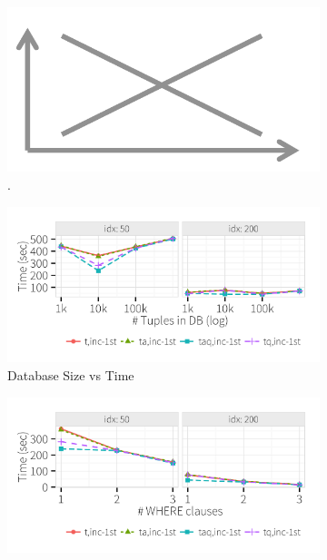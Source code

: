   \begin{figure}[h]
    \centering
    \begin{subfigure}[t]{.3\textwidth}
      \includegraphics[width = \columnwidth]{figures/placeholder}
      \vspace*{-.1in}
      \caption{.}
      \label{f:scale1} 
    \end{subfigure}
    \begin{subfigure}[t]{.3\textwidth}
      \includegraphics[width = \columnwidth]{figures/dbsize_time}
      \vspace*{-.1in}
      \caption{Database Size vs Time}
      \label{f:scale2} 
    \end{subfigure}
    \begin{subfigure}[t]{.3\textwidth}
      \includegraphics[width = \columnwidth]{figures/where_time}

\end{subfigure}
\end{figure}

